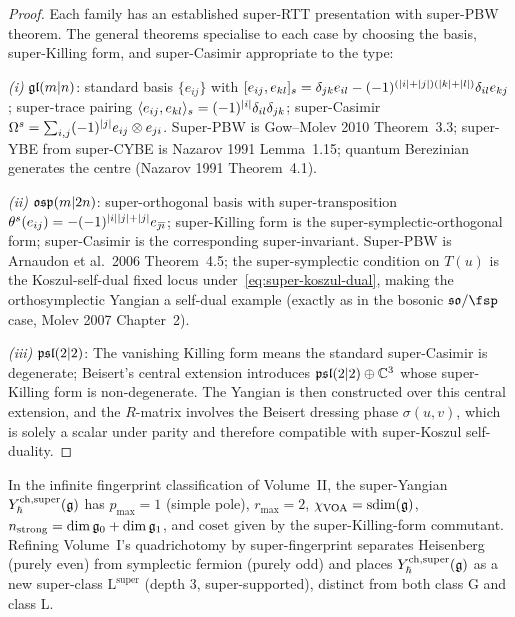\begin{proof}
Each family has an established super-RTT presentation with super-PBW
theorem. The general theorems specialise to each case by choosing the
basis, super-Killing form, and super-Casimir appropriate to the type:

\emph{(i)} $\mathfrak{gl}(m|n)$: standard basis $\{e_{ij}\}$ with
$[e_{ij}, e_{kl}]_s = \delta_{jk} e_{il} - (-1)^{(|i|+|j|)
(|k|+|l|)}\delta_{il} e_{kj}$; super-trace pairing
$\langle e_{ij}, e_{kl}\rangle_s = (-1)^{|i|}\delta_{il}\delta_{jk}$;
super-Casimir $\Omega^s = \sum_{i,j} (-1)^{|j|} e_{ij}\otimes e_{ji}$.
Super-PBW is Gow--Molev 2010 Theorem~3.3; super-YBE from super-CYBE is
Nazarov 1991 Lemma~1.15; quantum Berezinian generates the centre
(Nazarov 1991 Theorem~4.1).

\emph{(ii)} $\mathfrak{osp}(m|2n)$: super-orthogonal basis with super-transposition
$\theta^s(e_{ij}) = -(-1)^{|i||j|+|j|} e_{\bar\jmath\bar\imath}$;
super-Killing form is the super-symplectic-orthogonal form; super-Casimir
is the corresponding super-invariant. Super-PBW is Arnaudon et al.\ 2006
Theorem~4.5; the super-symplectic condition on $T(u)$ is the
Koszul-self-dual fixed locus under~\eqref{eq:super-koszul-dual}, making
the orthosymplectic Yangian a self-dual example (exactly as in the
bosonic $\fso/\fsp$ case, Molev 2007 Chapter~2).

\emph{(iii)} $\mathfrak{psl}(2|2)$: The vanishing Killing form means the standard
super-Casimir is degenerate; Beisert's central extension introduces
$\mathfrak{psl}(2|2)\oplus\mathbb{C}^3$ whose super-Killing form is
non-degenerate. The Yangian is then constructed over this central
extension, and the $R$-matrix involves the Beisert dressing phase
$\sigma(u,v)$, which is solely a scalar under parity and
therefore compatible with super-Koszul self-duality.
\end{proof}

\begin{remark}
\label{rem:super-fingerprint}
In the infinite fingerprint classification of Volume~II, the super-Yangian
$Y^{\mathrm{ch},\mathrm{super}}_{\hbar}(\mathfrak{g})$ has
$p_{\max} = 1$ (simple pole), $r_{\max} = 2$, $\chi_{\mathrm{VOA}}
= \operatorname{sdim}(\mathfrak{g})$, $n_{\mathrm{strong}}=\dim\mathfrak{g}_0+\dim\mathfrak{g}_1$, and
$\mathrm{coset}$ given by the super-Killing-form commutant.
Refining Volume~I's quadrichotomy by super-fingerprint separates
Heisenberg (purely even) from symplectic fermion (purely odd) and
places $Y^{\mathrm{ch},\mathrm{super}}_{\hbar}(\mathfrak{g})$ as a new super-class
$\mathrm{L}^{\mathrm{super}}$ (depth 3, super-supported), distinct
from both class G and class L.
\end{remark}

